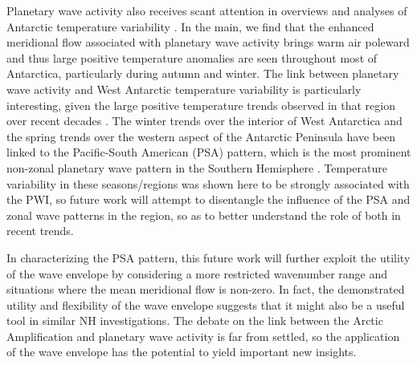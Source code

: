 Planetary wave activity also receives scant attention in overviews and analyses of Antarctic temperature variability \citep[e.g.][]{Russell2010,SchneiderOkumura2012,Yu2012}. In the main, we find that the enhanced meridional flow associated with planetary wave activity brings warm air poleward and thus large positive temperature anomalies are seen throughout most of Antarctica, particularly during autumn and winter. The link between planetary wave activity and West Antarctic temperature variability is particularly interesting, given the large positive temperature trends observed in that region over recent decades \citep[e.g.][]{Bromwich2013}. The winter trends over the interior of West Antarctica \citep{Ding2011} and the spring trends over the western aspect of the Antarctic Peninsula \citep{Ding2013} have been linked to the Pacific-South American (PSA) pattern, which is the most prominent non-zonal planetary wave pattern in the Southern Hemisphere \citep[e.g.][]{Mo2001}. Temperature variability in these seasons/regions was shown here to be strongly associated with the PWI, so future work will attempt to disentangle the influence of the PSA and zonal wave patterns in the region, so as to better understand the role of both in recent trends.    

In characterizing the PSA pattern, this future work will further exploit the utility of the wave envelope by considering a more restricted wavenumber range and situations where the mean meridional flow is non-zero. In fact, the demonstrated utility and flexibility of the wave envelope suggests that it might also be a useful tool in similar NH investigations. The debate on the link between the Arctic Amplification and planetary wave activity is far from settled, so the application of the wave envelope has the potential to yield important new insights.    

    